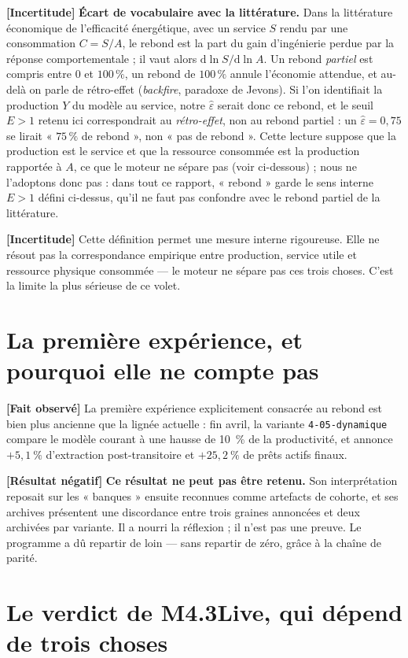 \documentclass[11pt,a4paper]{article}
\newcommand{\code}[1]{\texttt{#1}}
\newcommand{\fait}{\textbf{[Fait observé]}}
\newcommand{\negatif}{\textbf{[Résultat négatif]}}
\newcommand{\incertitude}{\textbf{[Incertitude]}}
\begin{document}
\incertitude{} \textbf{Écart de vocabulaire avec la littérature.} Dans la
littérature économique de l'efficacité énergétique, avec un service $S$ rendu par
une consommation $C=S/A$, le rebond est la part du gain d'ingénierie perdue par
la réponse comportementale ; il vaut alors $\mathrm{d}\ln S/\mathrm{d}\ln A$. Un
rebond \emph{partiel} est compris entre $0$ et $100\,\%$, un rebond de $100\,\%$
annule l'économie attendue, et au-delà on parle de rétro-effet
(\emph{backfire}, paradoxe de Jevons). Si l'on identifiait la production $Y$ du
modèle au service, notre $\widehat\varepsilon$ serait donc ce rebond, et le seuil
$E>1$ retenu ici correspondrait au \emph{rétro-effet}, non au rebond partiel :
un $\widehat\varepsilon=0{,}75$ se lirait « $75\,\%$ de rebond », non « pas de rebond ».
Cette lecture suppose que la production est le service et que la ressource
consommée est la production rapportée à $A$, ce que le moteur ne sépare pas
(voir ci-dessous) ; nous ne l'adoptons donc pas : dans tout ce rapport, « rebond »
garde le sens interne $E>1$ défini ci-dessus, qu'il ne faut pas confondre avec le
rebond partiel de la littérature.

\incertitude{} Cette définition permet une mesure interne rigoureuse. Elle ne
résout pas la correspondance empirique entre production, service utile et
ressource physique consommée --- le moteur ne sépare pas ces trois choses.
C'est la limite la plus sérieuse de ce volet.

\section{La première expérience, et pourquoi elle ne compte pas}

\fait{} La première expérience explicitement consacrée au rebond est bien plus
ancienne que la lignée actuelle : fin avril, la variante
\code{4-05-dynamique} compare le modèle courant à une hausse de 10~\% de la
productivité, et annonce $+5{,}1~\%$ d'extraction post-transitoire et
$+25{,}2~\%$ de prêts actifs finaux.

\negatif{} \textbf{Ce résultat ne peut pas être retenu.} Son interprétation
reposait sur les « banques » ensuite reconnues comme artefacts de cohorte, et
ses archives présentent une discordance entre trois graines annoncées et deux
archivées par variante. Il a nourri la réflexion ; il n'est pas une preuve. Le
programme a dû repartir de loin --- sans repartir de zéro, grâce à la chaîne de
parité.

\section{Le verdict de M4.3Live, qui dépend de trois choses}
\end{document}
